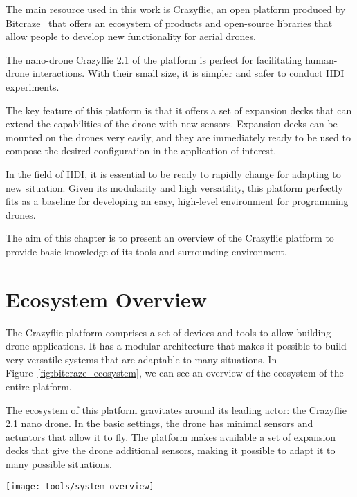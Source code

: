 The main resource used in this work is Crazyflie, an open platform produced by Bitcraze~\cite{bitcraze} 
that offers an ecosystem of products and open-source libraries that allow people to develop new functionality for aerial drones. 

The nano-drone Crazyflie 2.1 of the platform is perfect for facilitating human-drone interactions.
With their small size, it is simpler and safer to conduct HDI experiments. 

The key feature of this platform is that it offers a set of expansion decks that can extend the capabilities of the drone with new sensors. 
Expansion decks can be mounted on the drones very easily, and they are immediately ready to be used to compose the desired configuration in the application of interest.

In the field of HDI, it is essential to be ready to rapidly change for adapting to new situation.
Given its modularity and high versatility, this platform perfectly fits as a baseline for developing an easy, high-level environment for programming drones.

The aim of this chapter is to present an overview of the Crazyflie platform to provide basic knowledge of its tools and surrounding environment.

\section{Ecosystem Overview}\label{sec:ecosystem_oveerview}
The Crazyflie platform comprises a set of devices and tools to allow building drone applications. 
It has a modular architecture that makes it possible to build very versatile systems that are adaptable to many situations. 
In Figure~\ref{fig:bitcraze_ecosystem}, we can see an overview of the ecosystem of the entire platform.

The ecosystem of this platform gravitates around its leading actor: the Crazyflie 2.1 nano drone. 
In the basic settings, the drone has minimal sensors and actuators that allow it to fly. 
The platform makes available a set of expansion decks that give the drone additional sensors, making it possible to adapt it to many possible situations.


\begin{SCfigure}[\sidecaptionrelwidth][h]
    \texttt{[image: tools/system\_overview]}
    \caption[Bitcraze Ecosystem overview]{This picture represents an overview of the Bitcraze Ecosystem~\cite{bitcraze}}
    \label{fig:bitcraze_ecosystem}
\end{SCfigure}


